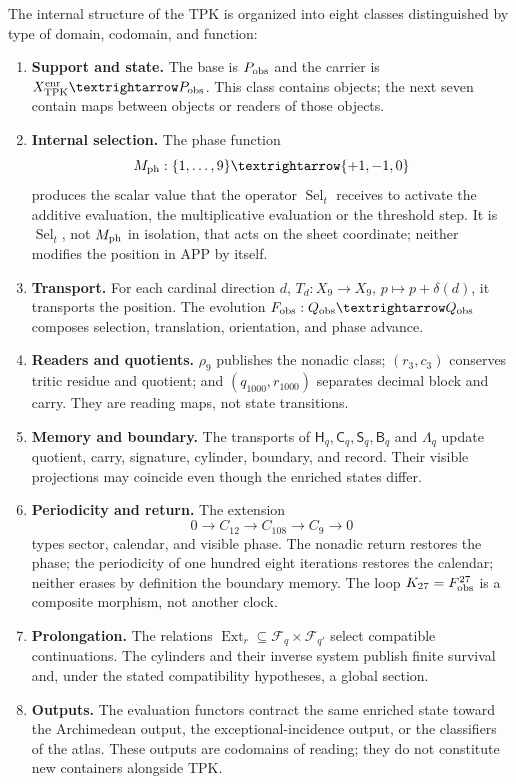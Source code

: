 \begin{definition}
\label{def:categorias-operatorias-tpk-rev11}
The internal structure of the TPK is organized into eight classes distinguished by type of
domain, codomain, and function:
\begin{enumerate}
 \item \textbf{Support and state.} The
base is \(\mathsf P_{\rm obs}\) and the carrier is \(\mathcal X_{\rm TPK}^{\rm enr}\to\mathsf P_{\rm obs}\). This class contains
objects; the next seven contain maps between objects or readers of those
objects.
 \item \textbf{Internal selection.} The phase function
 \[
 M_{\rm ph}:\{1,\ldots,9\}\longrightarrow\{+1,-1,0\}
 \]
 produces the scalar value that the operator
 \(\operatorname{Sel}_t\) receives to activate the additive evaluation, the
 multiplicative evaluation or the threshold step. It is \(\operatorname{Sel}_t\), not
 \(M_{\rm ph}\) in isolation, that acts on the sheet coordinate; neither
 modifies the position in APP by itself.
 \item \textbf{Transport.} For each cardinal direction \(d\),
 \(T_d:X_9\to X_9\), \(p\mapsto p+\delta(d)\), it transports the position. The
 evolution \(F_{\rm obs}:\mathcal Q_{\rm obs}\to\mathcal Q_{\rm obs}\)
 composes selection, translation, orientation, and phase advance.
 \item \textbf{Readers and quotients.} \(\rho_9\) publishes the nonadic class;
 \((r_3,c_3)\) conserves tritic residue and quotient; and
 \((q_{1000},r_{1000})\) separates decimal block and carry. They are
 reading maps, not state transitions.
 \item \textbf{Memory and boundary.} The transports of
 \(\mathsf H_q,\mathsf C_q,\mathsf S_q,\mathsf B_q\) and
 \(\mathsf\Lambda_q\) update quotient, carry, signature, cylinder, boundary,
 and record. Their visible projections may coincide even though the
 enriched states differ.
 \item \textbf{Periodicity and return.} The extension
 \[
 0\longrightarrow C_{12}\longrightarrow C_{108}
 \longrightarrow C_9\longrightarrow0
 \]
 types sector, calendar, and visible phase. The nonadic return restores the
 phase; the periodicity of one hundred eight iterations restores the calendar;
 neither erases
 by definition the boundary memory. The loop
 \(\mathcal K_{27}=F_{\rm obs}^{27}\) is a composite morphism, not another
 clock.
 \item \textbf{Prolongation.} The relations
 \(\operatorname{Ext}_r\subseteq\mathcal F_q\times\mathcal F_{q'}\)
 select compatible continuations. The cylinders and their inverse system
 publish finite survival and, under the stated compatibility
 hypotheses, a global section.
 \item \textbf{Outputs.} The evaluation functors contract the same enriched state
 toward the Archimedean output, the exceptional-incidence output,
 or the classifiers of the atlas. These outputs are codomains of
 reading; they do not constitute new containers alongside TPK.
\end{enumerate}
\end{definition}

